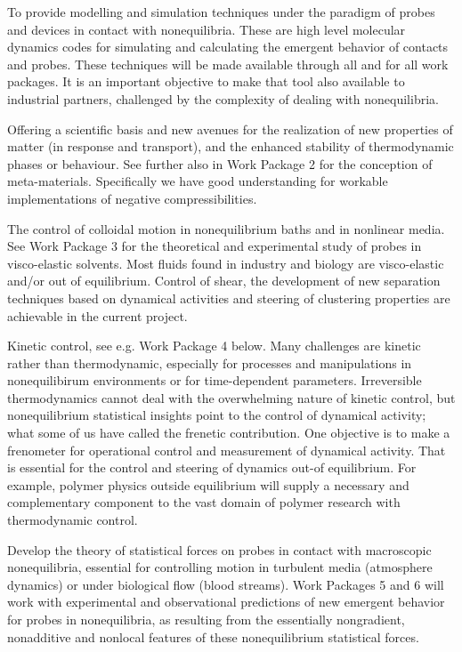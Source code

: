 \begin{inparaenum}[A.]
\item To provide modelling and simulation techniques under the paradigm of probes and
devices in contact with nonequilibria.  These are high level molecular dynamics codes for
simulating and calculating the emergent behavior of contacts and probes.  These techniques
will be made available through all and for all work packages. It is an important objective
to make that tool also available to industrial partners, challenged by the complexity of
dealing with nonequilibria.
\item Offering a scientific basis and new avenues for the realization of new properties of
matter (in response and transport), and the enhanced stability of thermodynamic phases or
behaviour.  See further also in Work Package 2 for the conception of
meta-materials. Specifically we have good understanding for workable implementations of
negative compressibilities.
\item The control of colloidal motion in nonequilibrium baths and in nonlinear media.  See
Work Package 3 for the theoretical and experimental study of probes in visco-elastic
solvents.  Most fluids found in industry and biology are visco-elastic and/or out of
equilibrium.  Control of shear, the development of new separation techniques based on
dynamical activities and steering of clustering properties are achievable in the current
project.
\item Kinetic control, see e.g. Work Package 4 below.  Many challenges are kinetic rather
than thermodynamic, especially for processes and manipulations in nonequilibirum
environments or for time-dependent parameters.  Irreversible thermodynamics cannot deal with
the overwhelming nature of kinetic control, but nonequilibrium statistical insights point to
the control of dynamical activity; what some of us have called the frenetic contribution.
One objective is to make a frenometer for operational control and measurement of dynamical
activity.  That is essential for the control and steering of dynamics out-of equilibrium.
For example, polymer physics outside equilibrium will supply a necessary and complementary
component to the vast domain of polymer research with thermodynamic control.
\item Develop the theory of statistical forces on probes in contact with macroscopic
nonequilibria, essential for controlling motion in turbulent media (atmosphere dynamics) or
under biological flow (blood streams).  Work Packages 5 and 6 will work with experimental
and observational predictions of new emergent behavior for probes in nonequilibria, as
resulting from the essentially nongradient, nonadditive and nonlocal features of these
nonequilibrium statistical forces.
\end{inparaenum}
